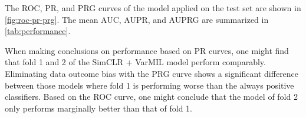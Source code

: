 The ROC, PR, and PRG curves of the model applied on the test set are shown in \cref{fig:roc-pr-prg}.
The mean AUC, AUPR, and AUPRG are summarized in \cref{tab:performance}.

When making conclusions on performance based on PR curves, one might find that fold 1 and 2 of the SimCLR + VarMIL model perform comparably.
Eliminating data outcome bias with the PRG curve shows a significant difference between those models where fold 1 is performing worse than the always positive classifiers.
Based on the ROC curve, one might conclude that the model of fold 2 only performs marginally better than that of fold 1.

